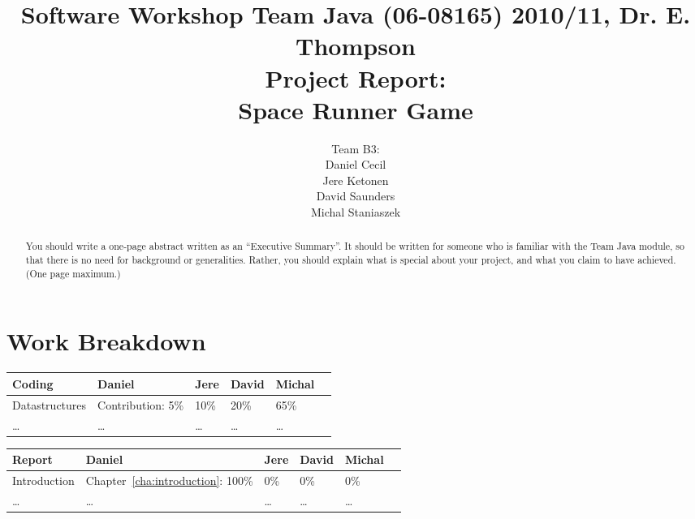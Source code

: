 \documentclass[10pt]{report}
\title{%
{\normalsize Software Workshop Team Java (06-08165) 2010/11, Dr. E. Thompson}\\[2cm]
Project Report:\\
Space Runner Game}
\author{Team B3:\\
Daniel Cecil\\
Jere Ketonen\\
David Saunders\\
Michal Staniaszek
}
\begin{document}
\maketitle
\chapter*{Work Breakdown}
\label{work-breakdown}

\thispagestyle{empty}

{\small

\noindent\begin{tabular}{|l||l|l|l|l|l|}\hline
  \textbf{Coding} & \textbf{Daniel} & \textbf{Jere} & \textbf{David}
 & \textbf{Michal} \\\hline\hline
 Datastructures & Contribution: 5\% & 10\% & 20\% & 65\%\\\hline
 \ldots & \ldots & \ldots & \ldots & \ldots \\\hline
\end{tabular}\vspace*{1cm}

\noindent\begin{tabular}{|l||l|l|l|l|l|}\hline
  \textbf{Report} & \textbf{Daniel} & \textbf{Jere} & \textbf{David}
 & \textbf{Michal}\\\hline\hline
 Introduction & Chapter~\ref{cha:introduction}: 100\% & 0\% & 0\% & 0\%\\\hline
 \ldots & \ldots & \ldots & \ldots & \ldots \\\hline
\end{tabular}

}     %

\tableofcontents
\thispagestyle{empty}

\begin{abstract}
  You should write a one-page abstract written as an ``Executive Summary''. It
  should be written for someone who is familiar with the Team Java module, so
  that there is no need for background or generalities. Rather, you should
  explain what is special about your project, and what you claim to have
  achieved. (One page maximum.)
\end{abstract}






\end{document}
